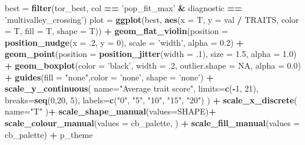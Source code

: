 \documentclass[]{book}
\newenvironment{Shaded}{\begin{snugshade}}{\end{snugshade}}
\newcommand{\DataTypeTok}[1]{\textcolor[rgb]{0.13,0.29,0.53}{#1}}
\newcommand{\DecValTok}[1]{\textcolor[rgb]{0.00,0.00,0.81}{#1}}
\newcommand{\FloatTok}[1]{\textcolor[rgb]{0.00,0.00,0.81}{#1}}
\newcommand{\KeywordTok}[1]{\textcolor[rgb]{0.13,0.29,0.53}{\textbf{#1}}}
\newcommand{\NormalTok}[1]{#1}
\newcommand{\OperatorTok}[1]{\textcolor[rgb]{0.81,0.36,0.00}{\textbf{#1}}}
\newcommand{\OtherTok}[1]{\textcolor[rgb]{0.56,0.35,0.01}{#1}}
\newcommand{\StringTok}[1]{\textcolor[rgb]{0.31,0.60,0.02}{#1}}
\begin{document}
\begin{Shaded}
\begin{Highlighting}[]
\NormalTok{best =}\StringTok{ }\KeywordTok{filter}\NormalTok{(tor_best, col }\OperatorTok{==}\StringTok{ 'pop_fit_max'} \OperatorTok{&}\StringTok{ }\NormalTok{diagnostic }\OperatorTok{==}\StringTok{ 'multivalley_crossing'}\NormalTok{)}
\NormalTok{plot =}\StringTok{  }\KeywordTok{ggplot}\NormalTok{(best, }\KeywordTok{aes}\NormalTok{(}\DataTypeTok{x =}\NormalTok{ T, }\DataTypeTok{y =}\NormalTok{ val }\OperatorTok{/}\StringTok{ }\NormalTok{TRAITS, }\DataTypeTok{color =}\NormalTok{ T, }\DataTypeTok{fill =}\NormalTok{ T, }\DataTypeTok{shape =}\NormalTok{ T)) }\OperatorTok{+}
\StringTok{          }\KeywordTok{geom_flat_violin}\NormalTok{(}\DataTypeTok{position =} \KeywordTok{position_nudge}\NormalTok{(}\DataTypeTok{x =} \FloatTok{.2}\NormalTok{, }\DataTypeTok{y =} \DecValTok{0}\NormalTok{), }\DataTypeTok{scale =} \StringTok{'width'}\NormalTok{, }\DataTypeTok{alpha =} \FloatTok{0.2}\NormalTok{) }\OperatorTok{+}
\StringTok{          }\KeywordTok{geom_point}\NormalTok{(}\DataTypeTok{position =} \KeywordTok{position_jitter}\NormalTok{(}\DataTypeTok{width =} \FloatTok{.1}\NormalTok{), }\DataTypeTok{size =} \FloatTok{1.5}\NormalTok{, }\DataTypeTok{alpha =} \FloatTok{1.0}\NormalTok{) }\OperatorTok{+}
\StringTok{          }\KeywordTok{geom_boxplot}\NormalTok{(}\DataTypeTok{color =} \StringTok{'black'}\NormalTok{, }\DataTypeTok{width =} \FloatTok{.2}\NormalTok{, }\DataTypeTok{outlier.shape =} \OtherTok{NA}\NormalTok{, }\DataTypeTok{alpha =} \FloatTok{0.0}\NormalTok{) }\OperatorTok{+}
\StringTok{          }\KeywordTok{guides}\NormalTok{(}\DataTypeTok{fill =} \StringTok{"none"}\NormalTok{,}\DataTypeTok{color =} \StringTok{'none'}\NormalTok{, }\DataTypeTok{shape =} \StringTok{'none'}\NormalTok{) }\OperatorTok{+}
\StringTok{          }\KeywordTok{scale_y_continuous}\NormalTok{(}
            \DataTypeTok{name=}\StringTok{"Average trait score"}\NormalTok{,}
            \DataTypeTok{limits=}\KeywordTok{c}\NormalTok{(}\OperatorTok{-}\DecValTok{1}\NormalTok{, }\DecValTok{21}\NormalTok{),}
            \DataTypeTok{breaks=}\KeywordTok{seq}\NormalTok{(}\DecValTok{0}\NormalTok{,}\DecValTok{20}\NormalTok{, }\DecValTok{5}\NormalTok{),}
            \DataTypeTok{labels=}\KeywordTok{c}\NormalTok{(}\StringTok{"0"}\NormalTok{, }\StringTok{"5"}\NormalTok{, }\StringTok{"10"}\NormalTok{, }\StringTok{"15"}\NormalTok{, }\StringTok{"20"}\NormalTok{)}
\NormalTok{          ) }\OperatorTok{+}
\StringTok{          }\KeywordTok{scale_x_discrete}\NormalTok{(}
            \DataTypeTok{name=}\StringTok{"T"}
\NormalTok{          )}\OperatorTok{+}
\StringTok{          }\KeywordTok{scale_shape_manual}\NormalTok{(}\DataTypeTok{values=}\NormalTok{SHAPE)}\OperatorTok{+}
\StringTok{          }\KeywordTok{scale_colour_manual}\NormalTok{(}\DataTypeTok{values =}\NormalTok{ cb_palette, ) }\OperatorTok{+}
\StringTok{          }\KeywordTok{scale_fill_manual}\NormalTok{(}\DataTypeTok{values =}\NormalTok{ cb_palette) }\OperatorTok{+}
\StringTok{          }\NormalTok{p_theme}


\end{Highlighting}
\end{Shaded}
\end{document}
